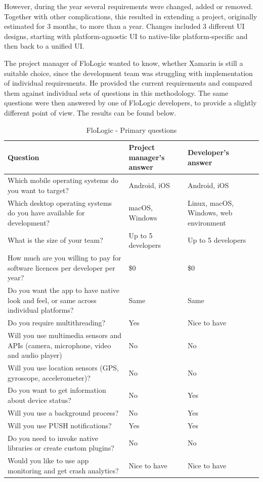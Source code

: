 \documentclass[english,master,public,dept460,male,cpdeclaration,oneside]{diploma}
\begin{document}
However, during the year several requirements were changed, added or removed. Together with other complications, this resulted in extending a project, originally estimated for 3 months, to more than a year. Changes included 3 different UI designs, starting with platform-agnostic UI to native-like platform-specific and then back to a unified UI. 

The project manager of FloLogic wanted to know, whether Xamarin is still a suitable choice, since the development team was struggling with implementation of individual requirements. He provided the current requirements and compared them against individual sets of questions in this methodology. The same questions were then answered by one of FloLogic developers, to provide a slightly different point of view. The results can be found below.

\begin{table}[!h]
	\centering
	\caption{FloLogic - Primary questions}
	\begin{tabular}{p{5.5cm} | p{3.5cm} | p{3.5cm}}
		\toprule		
		\textbf{Question} &	\textbf{Project manager’s answer} & \textbf{Developer’s answer} \\
		\midrule
		Which mobile operating systems do you want to target? &	Android, iOS & Android, iOS \\
		Which desktop operating systems do you have available for development? & macOS, Windows & Linux, macOS, Windows, web environment \\
		What is the size of your team? & Up to 5 developers & Up to 5 developers \\
		How much are you willing to pay for software licences per developer per year? & \$0 & \$0 \\
		Do you want the app to have native look and feel, or same across individual platforms? & Same & Same \\
		Do you require multithreading? & Yes & Nice to have \\
		Will you use multimedia sensors and APIs (camera, microphone, video and audio player) & No & No \\
		Will you use location sensors (GPS, gyroscope, accelerometer)? & No & No \\
		Do you want to get information about device status? & No & Yes \\
		Will you use a background process? & No & Yes \\
		Will you use PUSH notifications? & Yes & Yes \\
		Do you need to invoke native libraries or create custom plugins? & No & No \\
		Would you like to use app monitoring and get crash analytics? & Nice to have & Nice to have \\		
		\midrule
	\end{tabular}
\end{table}
\end{document}
